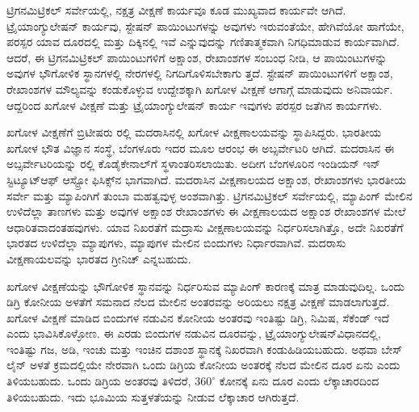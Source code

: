 ಟ್ರಿಗನಮಿಟ್ರಿಕಲ್​ ಸರ್ವೇಯಲ್ಲಿ, ನಕ್ಷತ್ರ ವೀಕ್ಷಣೆ ಕಾರ್ಯವೂ ಕೂಡ ಮುಖ್ಯವಾದ ಕಾರ್ಯವೇ ಆಗಿದೆ. ಟ್ರೈಯಾಂಗ್ಯುಲೇಷನ್​ ಕಾರ್ಯವು, ಸ್ಟೇಷನ್​ ಪಾಯಿಂಟುಗಳನ್ನು ಅವುಗಳು ಇರುವಂತೆಯೇ, ಹೇಗಿವೆಯೋ ಹಾಗೆಯೇ, ಪರಸ್ಪರ ಯಾವ ದೂರದಲ್ಲಿ ಮತ್ತು ದಿಕ್ಕಿನಲ್ಲಿ ಇವೆ ಎನ್ನುವುದನ್ನು ಗಣಿತಾತ್ಮಕವಾಗಿ ನಿಗಧಿಮಾಡುವ ಕಾರ್ಯವಾಗಿದೆ. ಆದರೆ, ಈ ಟ್ರಿಗನಮಿಟ್ರಿಕಲ್​ ಪಾಯಿಂಟುಗಳಿಗೆ ಅಕ್ಷಾಂಶ, ರೇಖಾಂಶಗಳ ಸಂಬಂಧ ನೀಡಿ, ಆ ಪಾಯಿಂಟುಗಳನ್ನು ಅವುಗಳ ಭೌಗೋಳಿಕ ಸ್ಥಾನಗಳಲ್ಲಿ ನೇರಗಳಲ್ಲಿ ನಿಗದಿಗೊಳಿಸಬೇಕಾಗು ತ್ತದೆ. ಸ್ಟೇಷನ್​ ಪಾಯಿಂಟುಗಳಿಗೆ ಅಕ್ಷಾಂಶ, ರೇಖಾಂಶಗಳ ಮೌಲ್ಯವನ್ನು ಕಂಡುಕೊಳ್ಳುವ ಉದ್ದೇಶಕ್ಕಾಗಿ ಖಗೋಳ ವೀಕ್ಷಣೆ ಆಗಾಗ್ಗೆ ಮಾಡುವುದು ಅನಿವಾರ್ಯ. ಆದ್ದರಿಂದ ಖಗೋಳ ವೀಕ್ಷಣೆ ಮತ್ತು ಟ್ರೈಯಾಂಗ್ಯುಲೇಷನ್​ ಕಾರ್ಯ ಇವುಗಳು ಪರಸ್ಪರ ಜತೆಗಿನ ಕಾರ್ಯಗಳು.

ಖಗೋಳ ವೀಕ್ಷಣೆಗೆ ಬ್ರಿಟೀಷರು ರಲ್ಲಿ ಮದರಾಸಿನಲ್ಲಿ ಖಗೋಳ ವೀಕ್ಷಣಾಲಯವನ್ನು ಸ್ಥಾಪಿಸಿದ್ದರು. ಭಾರತೀಯ ಖಗೋಳ ಭೌತ ವಿಜ್ಞಾನ ಸಂಸ್ಥೆ, ಬೆಂಗಳೂರು ಇದರ ಮೂಲ ಆರಂಭ ಈ ಅಬ್ಸರ್ವೇಟರಿ ಆಗಿದೆ. ಮದರಾಸಿನ ಈ ಅಬ್ಸರ್ವೇಟರಿಯನ್ನು ರಲ್ಲಿ ಕೊಡೈಕೇನಾಲ್​ಗೆ ಸ್ಥಳಾಂತರಿಸಲಾಯಿತು. ಅದೀಗ ಬೆಂಗಳೂರಿನ ಇಂಡಿಯನ್​ ಇನ್​ಸ್ಟಿಟ್ಯೂಟ್​ ಆಫ್​ ಆಸ್ಟ್ರೋ ಫಿಸಿಕ್ಸ್​ನ ಭಾಗವಾಗಿದೆ. ಮದರಾಸಿನ ವೀಕ್ಷಣಾಲಯದ ಅಕ್ಷಾಂಶ, ರೇಖಾಂಶಗಳು ಭಾರತೀಯ ಸರ್ವೇ ಮತ್ತು ಮ್ಯಾಪಿಂಗಿಗೆ ತುಂಬಾ ಮಹತ್ವವುಳ್ಳ ಅಂಶವಾಗಿತ್ತು. ಟ್ರಿಗನಮಿಟ್ರಿಕಲ್​ ಸರ್ವೇಯಲ್ಲಿ, ಮ್ಯಾಪಿಂಗ್​ ಮೇಲಿನ ಉಳಿದೆಲ್ಲಾ ತಾಣಗಳು ಮತ್ತು ಅವುಗಳ ಅಕ್ಷಾಂಶ ರೇಖಾಂಶಗಳು ಈ ವೀಕ್ಷಣಾಲಯದ ಅಕ್ಷಾಂಶ ರೇಖಾಂಶಗಳ ಮೇಲೆ ಆಧಾರಿತವಾದಂತಹವುಗಳು. ಯಾವ ನಿಖರತೆಗೆ ಮದ್ರಾಸು ವೀಕ್ಷಣಾಲಯವನ್ನು ನಿರ್ಧರಿಸಲಾಗಿತ್ತೊ, ಅದೇ ನಿಖರತೆಗೆ ಭಾರತದ ಉಳಿದೆಲ್ಲಾ ಮ್ಯಾಪುಗಳು, ಮ್ಯಾಪುಗಳ ಮೇಲಿನ ಬಿಂದುಗಳು ನಿರ್ಧಾರವಾಗಿವೆ. ಮದರಾಸು ವೀಕ್ಷಣಾಯಲವನ್ನು ಭಾರತದ ಗ್ರೀನಿಚ್​ ಎನ್ನಬಹುದು.

\newpage

ಖಗೋಳ ವೀಕ್ಷಣೆಯನ್ನು ಭೌಗೋಳಿಕ ಸ್ಥಾನವನ್ನು ನಿರ್ಧರಿಸುವ ಮ್ಯಾಪಿಂಗ್​ ಕಾರಣಕ್ಕೆ ಮಾತ್ರ ಮಾಡುವುದಿಲ್ಲ. ಒಂದು ಡಿಗ್ರಿ ಕೋನೀಯ ಅಳತೆಗೆ ಸಮನಾದ ನೆಲದ ಮೇಲಿನ ಅಂತರವನ್ನು ಅರಿಯಲು ನಕ್ಷತ್ರ ವೀಕ್ಷಣೆ ಮಾಡಲಾಗುತ್ತದೆ. ಖಗೋಳ ವೀಕ್ಷಣೆ ಮಾಡಿದ  ಬಿಂದುಗಳ ನಡುವಿನ ಕೋನೀಯ ಅಂತರವು ಇಂತಿಷ್ಟು ಡಿಗ್ರಿ, ನಿಮಿಷ, ಸೆಕೆಂಡ್​ ಇದೆ ಎಂದು ಭಾವಿಸಿಕೊಳ್ಳೋಣ. ಈ ಎರಡು ಬಿಂದುಗಳ ನಡುವಿನ ದೂರವನ್ನು, ಟ್ರೈಯಾಂಗ್ಯುಲೇಷನ್​ ವಿಧಾನದಲ್ಲಿ, ಇಂತಿಷ್ಟು ಗಜ, ಅಡಿ, ಇಂಚು ಮತ್ತು ಇಂಚಿನ ದಶಾಂಶ ಸ್ಥಾನಕ್ಕೆ ನಿಖರವಾಗಿ ಕಂಡುಹಿಡಿಯಬಹುದು. ಅಥವಾ ಬೇಸ್​ ಲೈನ್​ ಅಳತೆ ಕ್ರಮದಲ್ಲಿಯೇ ನೇರವಾಗಿ ಒಂದು ಡಿಗ್ರಿಯ ಕೋನೀಯ ಅಂತರಕ್ಕೆ ನೆಲದ ಮೇಲಿನ ದೂರ ಏನು ಎಂದು ತಿಳಿಯಬಹುದು. ಒಂದು ಡಿಗ್ರಿಯ ಅಂತರವು ತಿಳಿದರೆ, $360^\circ$ ಕೋನಕ್ಕೆ ಏನು ದೂರ ಎಂದು ಲೆಕ್ಕಾಚಾರದಿಂದ ತಿಳಿಯಬಹುದು. ಇದು ಭೂಮಿಯ ಸುತ್ತಳತೆಯನ್ನು ನೀಡುವ ಲೆಕ್ಕಾಚಾರ ಆಗಿರುತ್ತದೆ.

\vskip 4pt

